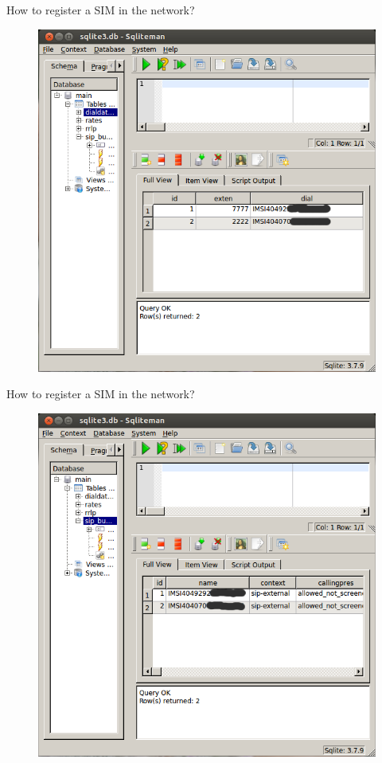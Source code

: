\documentclass{beamer}
\begin{document}
  \begin{frame}{How to register a SIM in the network?}
    \begin{figure}
      \centering
      \includegraphics[width=0.7\linewidth]{img/dialdata}
    \end{figure}
  \end{frame}
  
  \begin{frame}{How to register a SIM in the network?}
    \begin{figure}
      \centering
      \includegraphics[width=0.7\linewidth]{img/sipbuddies}
    \end{figure}
  \end{frame}
\end{document}
